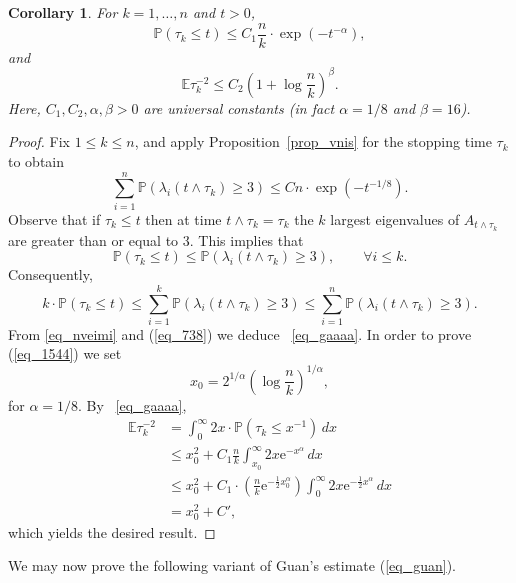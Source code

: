 \documentclass[12pt,a4paper]{article}
\newcommand{\E}{\mathbb{E}}
\newcommand{\prob}{\mathbb{P}}
\newcommand{\e}{\mathrm{e}}
\newtheorem{corollary}[theorem]{Corollary}
\theoremstyle{definition}
\begin{document}
%
\begin{corollary} \label{cor_main}
For $k=1,\ldots,n$ and $t > 0$,
\begin{equation}\label{eq_gaaaa}
\prob ( \tau_k  \leq t ) \leq C_1 \frac nk \cdot \exp ( - t^{-\alpha} ) ,
\end{equation}  
and
\begin{equation} 
\E \tau_k^{-2} \leq C_2 \left( 1 + \log \frac nk \right)^\beta.
\label{eq_1544} \end{equation}
Here, $C_1,C_2, \alpha, \beta > 0$ are universal constants (in fact $\alpha = 1/8$ and $\beta = 16$).
\end{corollary}
%
%
\begin{proof}
Fix $1 \leq k \leq n$, and apply Proposition~\ref{prop_vnis} for the stopping
time $\tau_k$ to obtain
\begin{equation}\label{eq_nveimi}
\sum_{i=1}^n \prob ( \lambda_i ( t\wedge \tau_k ) \geq 3 )
\leq C n \cdot \exp ( - t^{-1/8} ) .
\end{equation}
Observe that if $\tau_k \leq t$ then at time $t\wedge \tau_k = \tau_k$ the $k$
largest eigenvalues of $A_{t\wedge \tau_k}$ are greater than or equal to $3$.
This implies that
\[
\prob ( \tau_k \leq t ) \leq \prob ( \lambda_i ( t\wedge \tau_k ) \geq 3 ) , \qquad \forall i \leq k.
\]
Consequently,
\begin{equation}
k \cdot \prob ( \tau_k \leq t ) \leq \sum_{i=1}^k \prob ( \lambda_i ( t\wedge \tau_k ) \geq 3 ) \leq
\sum_{i=1}^n \prob ( \lambda_i ( t\wedge \tau_k ) \geq 3 ) .
\label{eq_738} \end{equation}
From  \eqref{eq_nveimi} and (\ref{eq_738}) we deduce ~\eqref{eq_gaaaa}. In order 
to prove (\ref{eq_1544}) we set 
\[
x_0 = 2^{1/\alpha} \left( \log  \frac nk \right)^{1/\alpha},
\]
for $\alpha = 1/8$.
By ~\eqref{eq_gaaaa}, 
\[
\begin{split}
\E \tau_k^{-2} & = \int_0^\infty 2x \cdot \prob ( \tau_k \leq x^{-1} ) \, dx \\
& \leq x_0^2 + C_1 \frac{n}{k} \int_{x_0}^\infty 2x \e^{-x^{\alpha} } \, dx  \\
& \leq x_0^2 + C_1 \cdot \left( \frac{n}{k} \e^{- \frac 12 x_0^{\alpha} } \right) \int_0^\infty 2x
\e^{- \frac 12 x^\alpha} \, dx \\
& = x_0^2 + C' ,
\end{split}
\]
which yields the desired result.
\end{proof}
%
We may now prove the following variant of Guan's estimate (\ref{eq_guan}).
\end{document}

